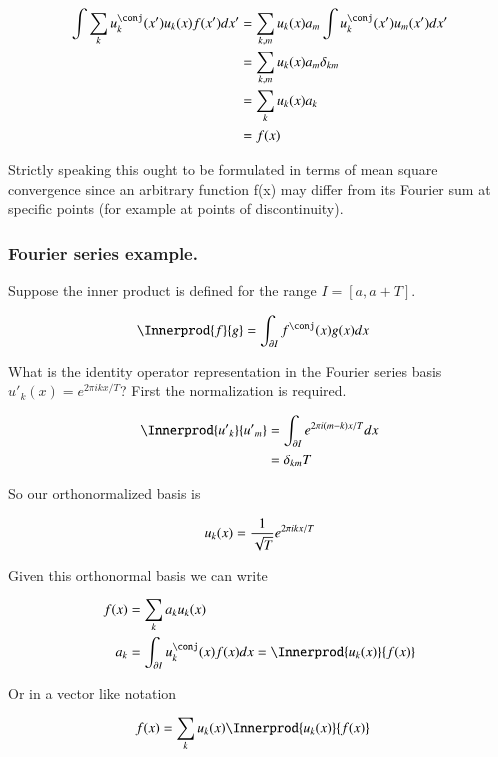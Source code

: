 \documentclass{article}
\begin{document}
\begin{align*}
\int \sum_{k} u_k^\conj(x') u_k(x) f(x') dx'
&=
\sum_{k,m} u_k(x) a_m \int u_k^\conj(x') u_m(x') dx' \\
&=
\sum_{k,m} u_k(x) a_m \delta_{km} \\
&=
\sum_{k} u_k(x) a_k \\
&=
f(x) 
\end{align*}

Strictly speaking this ought to be formulated in terms of mean square convergence since an arbitrary function f(x) 
may differ from its Fourier sum at specific points (for example at points of discontinuity).

\subsubsection{Fourier series example. }

Suppose the inner product is defined for the range $I = [a, a+T]$.

\begin{align*}
\Innerprod{f}{g} &= \int_{\partial I} f^\conj(x) g(x) dx
\end{align*}

What is the identity operator representation in the Fourier series basis ${u'}_k(x) = e^{ 2 \pi i k x / T}$?  First the 
normalization is required.

\begin{align*}
\Innerprod{{u'}_k}{{u'}_m} 
&= \int_{\partial I} e^{ 2 \pi i (m-k) x /T } dx  \\
&= \delta_{km} T
\end{align*}

So our orthonormalized basis is

\begin{align*}
u_k(x) = \frac{1}{\sqrt{T}} e^{ 2 \pi i k x / T}
\end{align*}

Given this orthonormal basis we can write 

\begin{align*}
f(x) 
&= \sum_k a_k u_k(x) \\
a_k &= \int_{\partial I} u_k^\conj(x) f(x) dx = \Innerprod{u_k(x)}{f(x)} \\
\end{align*}

Or in a vector like notation

\begin{align*}
f(x) &= \sum_k u_k(x) \Innerprod{u_k(x)}{f(x)}
\end{align*}
\end{document}
